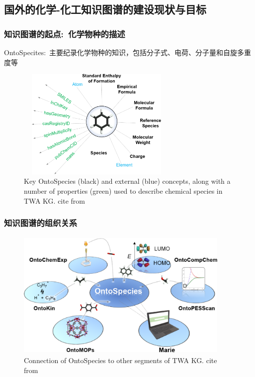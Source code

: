 \subsection{国外的化学-化工知识图谱的建设现状与目标}
\frame
{
	\frametitle{知识图谱的起点:~化学物种的描述}
		\textrm{OntoSpecites}:~主要纪录化学物种的知识，包括分子式、电荷、分子量和自旋多重度等
\begin{figure}[h!]
\centering
\vskip -1pt
\includegraphics[height=2.10in,width=3.05in,viewport=0 0 990 750,clip]{Figures/Key_OntoSpecies-and-external_concepts.png}
\caption{\tiny\textrm{Key OntoSpecies (black) and external (blue) concepts, along with a number of properties (green) used to describe chemical species in TWA KG. cite from~\cite{ACR56-128_2023}}}%
\label{Fig:Key-OntoSpecies-and-external-concepts}
\end{figure}
}

\frame
{
	\frametitle{知识图谱的组织关系}
\begin{figure}[h!]
\centering
\vskip -8pt
\includegraphics[height=2.45in,width=4.05in,viewport=0 0 1170 700,clip]{Figures/Connection-of-OntoSpecies-to-segments-of-KG.png}
\caption{\tiny\textrm{Connection of OntoSpecies to other segments of TWA KG. cite from~\cite{ACR56-128_2023}}}%
\label{Fig:OntoSpecies-to-segments-TWA}
\end{figure}
}

